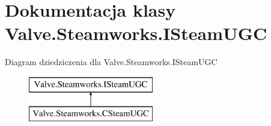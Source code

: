 \hypertarget{class_valve_1_1_steamworks_1_1_i_steam_u_g_c}{}\section{Dokumentacja klasy Valve.\+Steamworks.\+I\+Steam\+U\+GC}
\label{class_valve_1_1_steamworks_1_1_i_steam_u_g_c}
Diagram dziedziczenia dla Valve.\+Steamworks.\+I\+Steam\+U\+GC\begin{figure}[H]
\begin{center}
\leavevmode
\includegraphics[height=2.000000cm]{class_valve_1_1_steamworks_1_1_i_steam_u_g_c}
\end{center}
\end{figure}
